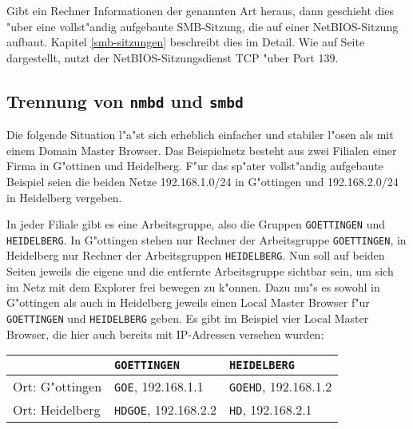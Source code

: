 \documentclass{scrartcl}\usepackage{pslatex}\typearea{12}
\newcommand{\prog}{\texttt}
\newcommand{\nbname}{\texttt}
\begin{document}
Gibt ein Rechner Informationen der genannten Art heraus, dann
geschieht dies "uber eine vollst"andig aufgebaute SMB-Sitzung, die auf
einer NetBIOS-Sitzung aufbaut. Kapitel \ref{smb-sitzungen} beschreibt
dies im Detail. Wie auf Seite \pageref{protokolle-und-ports}
dargestellt, nutzt der NetBIOS-Sitzungsdienst TCP "uber Port 139.

\subsection{Trennung von \prog{nmbd} und \prog{smbd}}

Die folgende Situation l"a"st sich erheblich einfacher und stabiler
l"osen als mit einem Domain Master Browser. Das Beispielnetz besteht
aus zwei Filialen einer Firma in G"ottinen und Heidelberg. F"ur das
sp"ater vollst"andig aufgebaute Beispiel seien die beiden Netze
192.168.1.0/24 in G"ottingen und 192.168.2.0/24 in Heidelberg
vergeben.

In jeder Filiale gibt es eine Arbeitsgruppe, also die Gruppen
\nbname{GOETTINGEN} und \nbname{HEIDELBERG}. In G"ottingen stehen nur
Rechner der Arbeitsgruppe \nbname{GOETTINGEN}, in Heidelberg nur
Rechner der Arbeitsgruppen \nbname{HEIDELBERG}. Nun soll auf beiden
Seiten jeweils die eigene und die entfernte Arbeitsgruppe sichtbar
sein, um sich im Netz mit dem Explorer frei bewegen zu k"onnen.  Dazu
mu"s es sowohl in G"ottingen als auch in Heidelberg jeweils einen
Local Master Browser f"ur \nbname{GOETTINGEN} und \nbname{HEIDELBERG}
geben. Es gibt im Beispiel vier Local Master Browser, die hier auch
bereits mit IP-Adressen versehen wurden:

\vspace{\baselineskip}
\begin{center}
\begin{tabular}{|l|l|l|}\hline
&\nbname{GOETTINGEN}&\nbname{HEIDELBERG}\\
\hline
Ort: G"ottingen & \nbname{GOE}, 192.168.1.1 & \nbname{GOEHD}, 192.168.1.2 \\
Ort: Heidelberg & \nbname{HDGOE}, 192.168.2.2 & \nbname{HD}, 192.168.2.1 \\
\hline
\end{tabular}
\end{center}
\vspace{\baselineskip}

\end{document}
